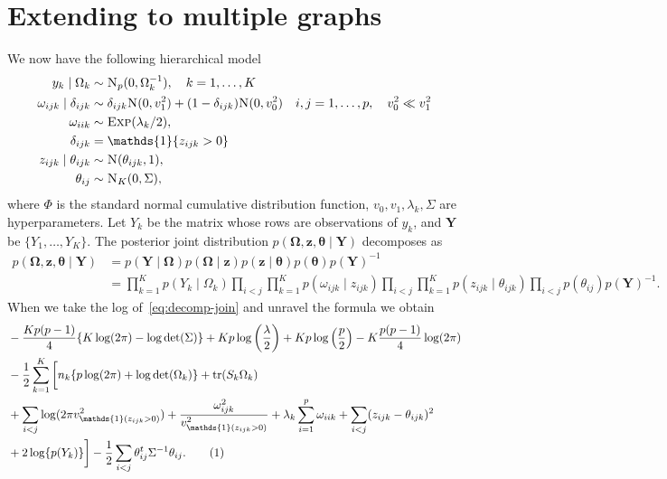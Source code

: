 \documentclass[a4paper, 11pt, oneside]{report}
\DeclareMathOperator{\tr}{tr}
\newcommand{\1}{\mathds{1}}
\newcommand{\inv}{^{-1}}
\newcommand{\Np}{\textsc{N}_p}
\newcommand{\Nor}{\textsc{N}}
\newcommand{\Exp}{\textsc{Exp}}
\newcommand{\bOmega}{\mathbf{\Omega}}
\newcommand{\bz}{\mathbf{z}}
\newcommand{\btheta}{\mathbf{\theta}}
\newcommand{\bY}{\mathbf{Y}}
\begin{document}
\chapter{Extending to multiple graphs}
We now have the following hierarchical model
\begin{align*}
	y_k \mid \Omega_k              & \sim \Np(0, \Omega_k^{-1}), \quad k=1,\dots,K                                                                     \\
	\omega_{ijk} \mid \delta_{ijk} & \sim \delta_{ijk} \Nor(0, v_1^2) + (1 - \delta_{ijk}) \Nor(0, v_0^2) \quad i,j = 1,\dots,p, \quad v_0^2 \ll v_1^2 \\
	\omega_{iik}                   & \sim \Exp(\lambda_k/2),                                                                                           \\
	\delta_{ijk}                   & = \1\{z_{ijk} > 0\}                                                                                               \\
	z_{ijk} \mid \theta_{ijk}      & \sim \Nor(\theta_{ijk}, 1),                                                                                       \\
	\theta_{ij}                    & \sim \textsc{N}_K(0, \Sigma),
\end{align*}
where $\Phi$ is the standard normal cumulative distribution function, $v_0,
	v_1, \lambda_k, \Sigma$ are hyperparameters.
Let $Y_k$ be the matrix whose rows are observations of $y_k$, and $\mathbf{Y}$
be $\{Y_1,\dots,Y_K\}$.
The posterior joint distribution $p(\mathbf{\Omega},  \mathbf{z},
	\mathbf{\theta} \mid \mathbf{Y})$ decomposes as
\begin{align}\label{eq:decomp-join}
	p(\bOmega,  \bz, \btheta \mid \bY) & = p(\bY \mid \bOmega) p(\bOmega \mid \bz)
	p(\bz \mid \btheta) p(\btheta) p(\bY)\inv \nonumber                            \\
	                                   & = \prod_{k=1}^K p(Y_k \mid \Omega_k)
	\prod_{i < j}\prod_{k=1}^K p(\omega_{ijk}
	\mid z_{ijk}) \prod_{i < j}\prod_{k=1}^K
	p(z_{ijk} \mid \theta_{ijk})\prod_{i <
		j} p(\theta_{ij}) p(\bY)\inv.
\end{align}
When we take the log of~\ref{eq:decomp-join} and unravel the formula we obtain
\begin{align*}
	 & -\frac{Kp(p-1)}{4}\{K \log(2\pi) - \log\det(\Sigma)\} + K p
	\log\left(\frac{\lambda}{2}\right) + K p \log\left(\frac{p}{2}\right) - K
	\frac{p(p-1)}{4} \log(2\pi)                                                                  \\
	 & - \frac{1}{2} \sum_{k=1}^K \bigg[ n_k \{p \log(2\pi) + \log\det(\Omega_k)\} +
	\tr(S_k \Omega_k)                                                                            \\
	 & + \sum_{i < j} \log(2\pi v^2_{\1(z_{ijk} > 0)}) +
	\frac{\omega_{ijk}^2}{v^2_{\1(z_{ijk} > 0)}} + \lambda_k \sum_{i=1}^p
	\omega_{iik} + \sum_{i < j} (z_{ijk} - \theta_{ijk})^2                                       \\
	 & + 2 \log\{p(Y_k)\} \bigg] -\frac{1}{2} \sum_{i < j} \theta_{ij}^t \Sigma\inv \theta_{ij}.
	\stepcounter{equation}\tag{\theequation}\label{eq:mg-joint}
\end{align*}
\end{document}
